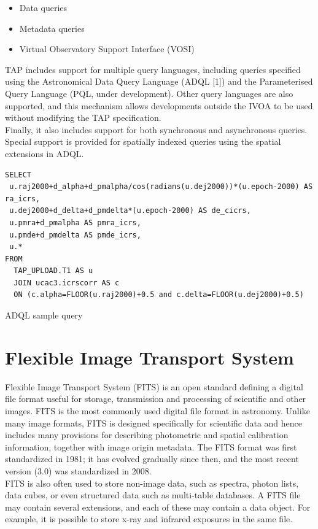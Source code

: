 \begin{itemize}
\item Data queries
\item Metadata queries
\item Virtual Observatory Support Interface (VOSI)
\end{itemize}


TAP includes support for multiple query languages, including queries specified using the Astronomical Data Query Language (ADQL [1]) and the Parameterised Query Language (PQL, under development). Other query languages are also supported, and this mechanism allows developments outside the IVOA to be used without modifying the TAP specification.\\

Finally, it also includes support for both synchronous and asynchronous queries. Special support is provided for spatially indexed queries using the spatial extensions in ADQL.\\


\begin{lstlisting}
SELECT 
 u.raj2000+d_alpha+d_pmalpha/cos(radians(u.dej2000))*(u.epoch-2000) AS ra_icrs,
 u.dej2000+d_delta+d_pmdelta*(u.epoch-2000) AS de_cicrs,
 u.pmra+d_pmalpha AS pmra_icrs,
 u.pmde+d_pmdelta AS pmde_icrs,
 u.*
FROM
  TAP_UPLOAD.T1 AS u
  JOIN ucac3.icrscorr AS c
  ON (c.alpha=FLOOR(u.raj2000)+0.5 and c.delta=FLOOR(u.dej2000)+0.5)
\end{lstlisting}
ADQL sample query

\section{Flexible Image Transport System}
 
Flexible Image Transport System (FITS) is an open standard defining a digital file format useful for storage, transmission and processing of scientific and other images. FITS is the most commonly used digital file format in astronomy. Unlike many image formats, FITS is designed specifically for scientific data and hence includes many provisions for describing photometric and spatial calibration information, together with image origin metadata. The FITS format was first standardized in 1981; it has evolved gradually since then, and the most recent version (3.0) was standardized in 2008.\\
  
FITS is also often used to store non-image data, such as spectra, photon lists, data cubes, or even structured data such as multi-table databases. A FITS file may contain several extensions, and each of these may contain a data object. For example, it is possible to store x-ray and infrared exposures in the same file.\\
 
